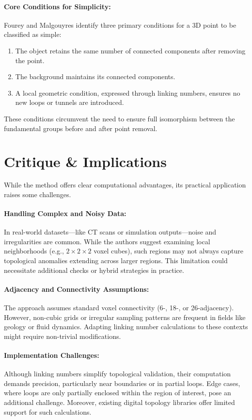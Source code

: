 \documentclass{llncs}
\begin{document}
\paragraph{Core Conditions for Simplicity:}
Fourey and Malgouyres identify three primary conditions for a 3D point to be classified as simple:
\begin{enumerate}
\item The object retains the same number of connected components after removing the point.
\item The background maintains its connected components.
\item A local geometric condition, expressed through linking numbers, ensures no new loops or tunnels are introduced.
\end{enumerate}
These conditions circumvent the need to ensure full isomorphism between the fundamental groups before and after point removal.

\section*{Critique \& Implications}

While the method offers clear computational advantages, its practical application raises some challenges.

\paragraph{Handling Complex and Noisy Data:}
In real-world datasets—like CT scans or simulation outputs—noise and irregularities are common. While the authors suggest examining local neighborhoods (e.g., $2\times2\times2$ voxel cubes), such regions may not always capture topological anomalies extending across larger regions. This limitation could necessitate additional checks or hybrid strategies in practice.

\paragraph{Adjacency and Connectivity Assumptions:}
The approach assumes standard voxel connectivity (6-, 18-, or 26-adjacency). However, non-cubic grids or irregular sampling patterns are frequent in fields like geology or fluid dynamics. Adapting linking number calculations to these contexts might require non-trivial modifications.

\paragraph{Implementation Challenges:}
Although linking numbers simplify topological validation, their computation demands precision, particularly near boundaries or in partial loops. Edge cases, where loops are only partially enclosed within the region of interest, pose an additional challenge. Moreover, existing digital topology libraries offer limited support for such calculations.
\end{document}
